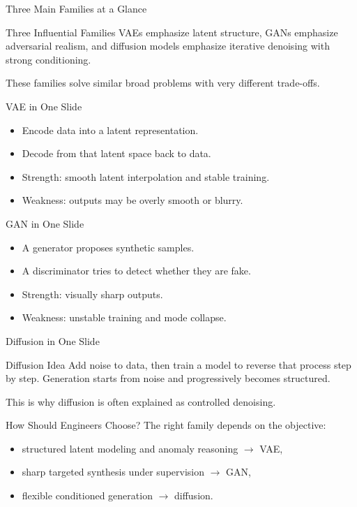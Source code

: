 \documentclass[12pt]{beamer}
\begin{document}
\begin{frame}{Three Main Families at a Glance}
  \begin{conceptbox}{Three Influential Families}
    VAEs emphasize latent structure, GANs emphasize adversarial realism, and diffusion models emphasize iterative denoising with strong conditioning.
  \end{conceptbox}

  These families solve similar broad problems with very different trade-offs.
\end{frame}

\begin{frame}{VAE in One Slide}
  \begin{itemize}
    \item Encode data into a latent representation.
    \item Decode from that latent space back to data.
    \item Strength: smooth latent interpolation and stable training.
    \item Weakness: outputs may be overly smooth or blurry.
  \end{itemize}
\end{frame}

\begin{frame}{GAN in One Slide}
  \begin{itemize}
    \item A generator proposes synthetic samples.
    \item A discriminator tries to detect whether they are fake.
    \item Strength: visually sharp outputs.
    \item Weakness: unstable training and mode collapse.
  \end{itemize}
\end{frame}

\begin{frame}{Diffusion in One Slide}
  \begin{conceptbox}{Diffusion Idea}
    Add noise to data, then train a model to reverse that process step by step. Generation starts from noise and progressively becomes structured.
  \end{conceptbox}

  This is why diffusion is often explained as controlled denoising.
\end{frame}

\begin{frame}{How Should Engineers Choose?}
  The right family depends on the objective:
  \begin{itemize}
    \item structured latent modeling and anomaly reasoning $\rightarrow$ VAE,
    \item sharp targeted synthesis under supervision $\rightarrow$ GAN,
    \item flexible conditioned generation $\rightarrow$ diffusion.
  \end{itemize}
\end{frame}
\end{document}
